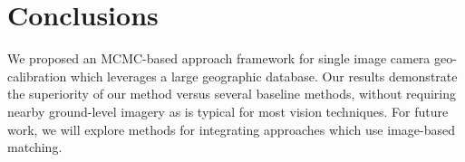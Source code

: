 \section{Conclusions}

We proposed an MCMC-based approach framework for single image camera
geo-calibration which leverages a large geographic database. Our
results demonstrate the superiority of our method versus several
baseline methods, without requiring nearby ground-level imagery as is
typical for most vision techniques. For future work, we will explore
methods for integrating approaches which use image-based matching. 
